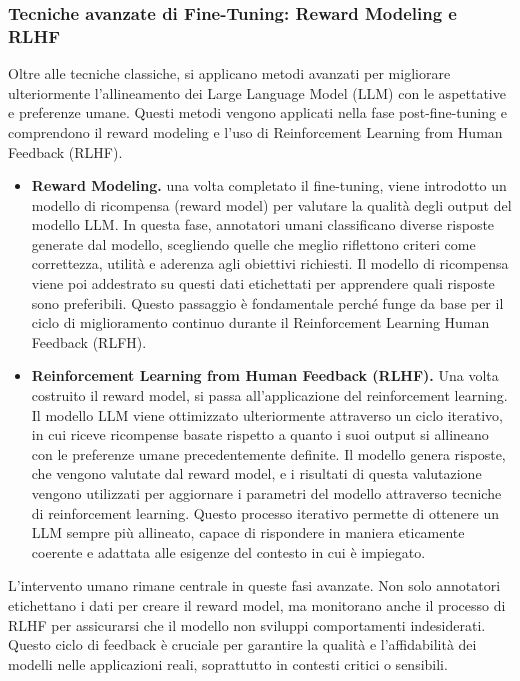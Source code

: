 \documentclass[target=mst,aauheader=,style=]{thud}
\begin{document}
\subsubsection{Tecniche avanzate di Fine-Tuning: Reward Modeling e RLHF}
Oltre alle tecniche classiche, si applicano metodi avanzati per migliorare ulteriormente l’allineamento dei Large Language Model (LLM) con le aspettative e preferenze umane. Questi metodi vengono applicati nella fase post-fine-tuning e comprendono il reward modeling e l’uso di Reinforcement Learning from Human Feedback (RLHF).\cite{hadi_2024}

\begin{itemize}
    \item \textbf{Reward Modeling.} una volta completato il fine-tuning, viene introdotto un modello di ricompensa (reward model) per valutare la qualità degli output del modello LLM. In questa fase, annotatori umani classificano diverse risposte generate dal modello, scegliendo quelle che meglio riflettono criteri come correttezza, utilità e aderenza agli obiettivi richiesti. Il modello di ricompensa viene poi addestrato su questi dati etichettati per apprendere quali risposte sono preferibili. Questo passaggio è fondamentale perché funge da base per il ciclo di miglioramento continuo durante il Reinforcement Learning Human Feedback (RLFH).
    \item \textbf{Reinforcement Learning from Human Feedback (RLHF).} Una volta costruito il reward model, si passa all’applicazione del reinforcement learning. Il modello LLM viene ottimizzato ulteriormente attraverso un ciclo iterativo, in cui riceve ricompense basate rispetto a quanto i suoi output si allineano con le preferenze umane precedentemente definite. Il modello genera risposte, che vengono valutate dal reward model, e i risultati di questa valutazione vengono utilizzati per aggiornare i parametri del modello attraverso tecniche di reinforcement learning. Questo processo iterativo permette di ottenere un LLM sempre più allineato, capace di rispondere in maniera eticamente coerente e adattata alle esigenze del contesto in cui è impiegato.
\end{itemize}

L'intervento umano rimane centrale in queste fasi avanzate. Non solo annotatori etichettano i dati per creare il reward model, ma monitorano anche il processo di RLHF per assicurarsi che il modello non sviluppi comportamenti indesiderati. Questo ciclo di feedback è cruciale per garantire la qualità e l'affidabilità dei modelli nelle applicazioni reali, soprattutto in contesti critici o sensibili.
\end{document}
